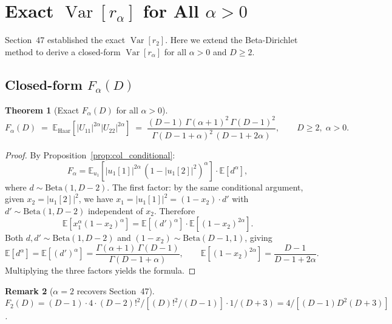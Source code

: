 \documentclass[12pt,a4paper]{article}
\newtheorem{theorem}{Theorem}[section]
\newtheorem{remark}[theorem]{Remark}
\begin{document}
\section{Exact $\operatorname{Var}[r_\alpha]$ for All $\alpha>0$}
\label{sec:var_alpha}

Section~47 established the exact $\operatorname{Var}[r_2]$.
Here we extend the Beta-Dirichlet method to derive a closed-form
$\operatorname{Var}[r_\alpha]$ for all $\alpha>0$ and $D\geq2$.

\subsection{Closed-form $F_\alpha(D)$}
\label{sec:F_alpha}

\begin{theorem}[Exact $F_\alpha(D)$ for all $\alpha>0$]
\label{thm:F_alpha}
\[
  F_\alpha(D) \;=\; \mathbb{E}_{\mathrm{Haar}}\!\left[|U_{11}|^{2\alpha}|U_{22}|^{2\alpha}\right]
  \;=\;
  \frac{(D-1)\,\Gamma(\alpha+1)^2\,\Gamma(D-1)^2}
       {\Gamma(D-1+\alpha)^2\,(D-1+2\alpha)},
  \qquad D\geq2,\;\alpha>0.
\]
\end{theorem}

\begin{proof}
By Proposition~\ref{prop:col_conditional}:
\[
  F_\alpha = \mathbb{E}_{u_1}\!\left[|u_1[1]|^{2\alpha}\,(1-|u_1[2]|^2)^\alpha\right]
  \cdot \mathbb{E}[d^\alpha],
\]
where $d\sim\mathrm{Beta}(1,D-2)$.
The first factor: by the same conditional argument,
given $x_2=|u_1[2]|^2$, we have $x_1=|u_1[1]|^2=(1-x_2)\cdot d'$ with
$d'\sim\mathrm{Beta}(1,D-2)$ independent of $x_2$.  Therefore
\[
  \mathbb{E}[x_1^\alpha(1-x_2)^\alpha] = \mathbb{E}[(d')^\alpha]\cdot\mathbb{E}[(1-x_2)^{2\alpha}].
\]
Both $d,d'\sim\mathrm{Beta}(1,D-2)$ and $(1-x_2)\sim\mathrm{Beta}(D-1,1)$, giving
\[
  \mathbb{E}[d^\alpha]=\mathbb{E}[(d')^\alpha]=\frac{\Gamma(\alpha+1)\,\Gamma(D-1)}{\Gamma(D-1+\alpha)},
  \qquad
  \mathbb{E}[(1-x_2)^{2\alpha}]=\frac{D-1}{D-1+2\alpha}.
\]
Multiplying the three factors yields the formula.
\end{proof}

\begin{remark}[$\alpha=2$ recovers Section~47]
$F_2(D)=(D-1)\cdot4\cdot(D-2)!^2/[(D)!^2/(D-1)]\cdot1/(D+3)
=4/[(D-1)D^2(D+3)]$. \checkmark
\end{remark}
\end{document}
